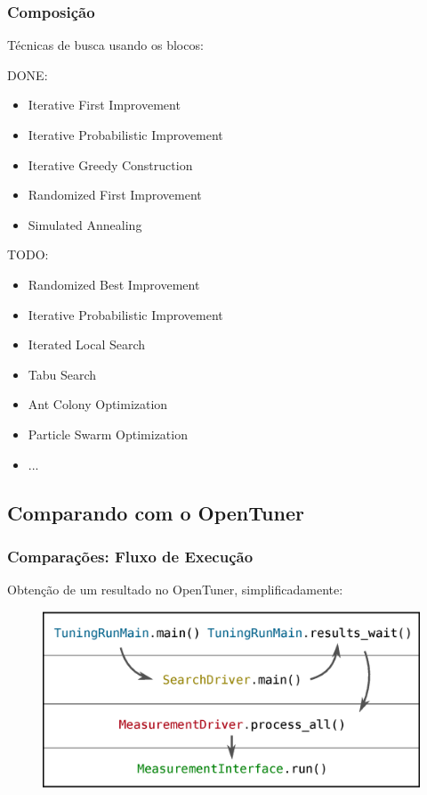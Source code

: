\documentclass[10pt, compress]{beamer}
\begin{document}
\begin{frame}[fragile]
    \frametitle{Composição}
    Técnicas de busca usando os blocos:

    \alert{DONE}:
    \begin{itemize}
        \item Iterative First Improvement
        \item Iterative Probabilistic Improvement
        \item Iterative Greedy Construction
        \item Randomized First Improvement
        \item Simulated Annealing
    \end{itemize}

    \alert{TODO}:
    \begin{itemize}
        \item Randomized Best Improvement
        \item Iterative Probabilistic Improvement
        \item Iterated Local Search
        \item Tabu Search
        \item Ant Colony Optimization
        \item Particle Swarm Optimization
        \item ...
    \end{itemize}
\end{frame}

\subsection{Comparando com o OpenTuner}

\begin{frame}[fragile]
    \frametitle{Comparações: Fluxo de Execução}
    Obtenção de um resultado no OpenTuner, simplificadamente:
    \begin{figure}[H]
        \centering
        \includegraphics[width=.9\textwidth]{opentunerflow_simple}
    \end{figure}%
\end{frame}
\end{document}
